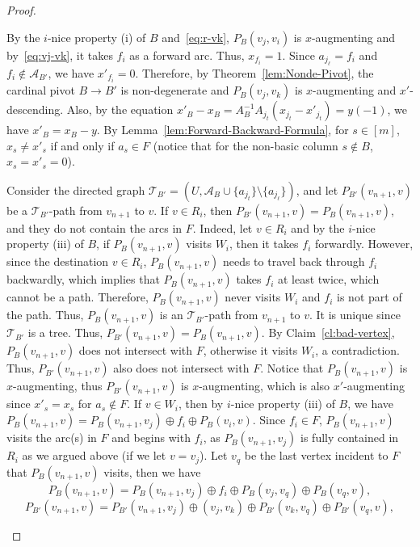 \documentclass[11pt]{article}
\begin{document}
\begin{proof}
\begin{enumerate}
    


    
    
    By the $i$-nice property (i) of $B$ and~\eqref{eq:r-vk}, $P_B(v_j,v_i)$ is $x$-augmenting and by~\eqref{eq:vj-vk}, it takes $f_i$ as a forward arc. Thus, $x_{f_i}=1$. Since $a_{j_\ell}=f_i$ and $f_i\notin \mathcal{A}_{B'}$, we have $x'_{f_i}=0$. Therefore, by Theorem~\ref{lem:Nonde-Pivot}, the cardinal pivot $B\to B'$ is non-degenerate and $P_B(v_j,v_k)$ is $x$-augmenting and $x'$-descending. Also, by the equation $x'_B-x_B=A_B^{-1}A_{j_t}(x_{j_t}-x'_{j_t})=y(-1)$, we have $x'_B=x_B-y$. By Lemma~\ref{lem:Forward-Backward-Formula}, for $s\in[m]$, $x_s\neq x'_s$ if and only if $a_s\in F$ (notice that for the non-basic column $s\notin B$, $x_s=x'_s=0$). 

    


    Consider the directed graph $\mathcal{T}_{B'}=(U,\mathcal{A}_B\cup\{a_{j_t}\}\setminus\{a_{j_\ell}\})$, and let $P_{B'}(v_{n+1},v)$ be a $\mathcal{T}_{B'}$-path from $v_{n+1}$ to $v$. If $v\in R_i$, then $P_{B'}(v_{n+1},v)=P_B(v_{n+1},v)$, and they do not contain the arcs in $F$. Indeed, let $v\in R_i$ and by the $i$-nice property (iii) of $B$, if $P_B(v_{n+1},v)$ visits $W_i$, then it takes $f_i$ forwardly. However, since the destination $v\in R_i$, $P_B(v_{n+1},v)$ needs to travel back through $f_i$ backwardly, which implies that $P_B(v_{n+1},v)$ takes $f_i$ at least twice, which cannot be a path. Therefore, $P_B(v_{n+1},v)$ never visits $W_i$ and $f_i$ is not part of the path. Thus, $P_B(v_{n+1},v)$ is an $\mathcal{T}_{B'}$-path from $v_{n+1}$ to $v$. It is unique since $\mathcal{T}_{B'}$ is a tree. Thus, $P_{B'}(v_{n+1},v)=P_B(v_{n+1},v)$. By Claim~\ref{cl:bad-vertex}, $P_B(v_{n+1},v)$ does not intersect with $F$, otherwise it visits $W_i$, a contradiction. Thus, $P_{B'}(v_{n+1},v)$ also does not intersect with $F$. Notice that $P_B(v_{n+1},v)$ is $x$-augmenting, thus $P_{B'}(v_{n+1},v)$ is $x$-augmenting, which is also $x'$-augmenting since $x'_s=x_s$ for $a_s\notin F$. If $v\in W_i$, then by $i$-nice property (iii) of $B$, we have $P_B(v_{n+1},v)=P_B(v_{n+1},v_j)\oplus f_i\oplus P_B(v_i,v)$. Since $f_i\in F$, $P_B(v_{n+1},v)$ visits the arc(s) in $F$ and begins with $f_i$, as $P_B(v_{n+1},v_j)$ is fully contained in $R_i$ as we argued above (if we let $v=v_j$). Let $v_q$ be the last vertex incident to $F$ that $P_B(v_{n+1},v)$ visits, then we have 
    $$P_B(v_{n+1},v)=P_B(v_{n+1},v_j)\oplus f_i\oplus P_B(v_j,v_q)\oplus P_B(v_q,v),$$
    $$P_{B'}(v_{n+1},v)=P_{B'}(v_{n+1},v_j)\oplus(v_j,v_k)\oplus P_{B'}(v_k,v_q)\oplus P_{B'}(v_q,v),$$

\end{enumerate}
\end{proof}
\end{document}
